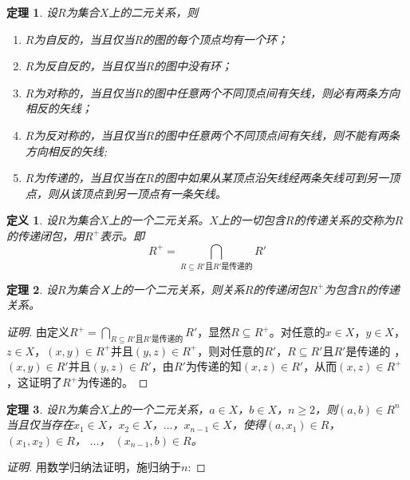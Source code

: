 \documentclass{article}
\newtheorem{Def}{定义}
\newtheorem{Thm}{定理}
\begin{document}
\begin{CJK*}{UTF8}{gbsn}
{
}  

  \begin{Thm}
  设$R$为集合$X$上的二元关系，则
  \begin{enumerate}
  \item $R$为自反的，当且仅当$R$的图的每个顶点均有一个环；
  \item $R$为反自反的，当且仅当$R$的图中没有环；
  \item $R$为对称的，当且仅当$R$的图中任意两个不同顶点间有矢线，则必有两条方向相反的矢线；
  \item $R$为反对称的，当且仅当$R$的图中任意两个不同顶点间有矢线，则不能有两条方向相反的矢线;
  \item $R$为传递的，当且仅当在$R$的图中如果从某顶点沿矢线经两条矢线可到另一顶点，则从该顶点到另一顶点有一条矢线。
  \end{enumerate}
\end{Thm}

  \begin{Def}
    设$R$为集合$X$上的一个二元关系。$X$上的一切包含$R$的传递关系的交称为$R$的传递闭包，用$R^+$表示。即
    \begin{equation*}
      R^+ = \bigcap_{R \subseteq R' \text{且} R'\text{是传递的}}R'
    \end{equation*}
  \end{Def}
  \begin{Thm}
    设$R$为集合Ｘ上的一个二元关系，则关系$R$的传递闭包$R^+$为包含$R$的传递关系。
  \end{Thm}
\begin{proof}[证明]
    由定义$R^+ = \bigcap_{R \subseteq R' \text{且} R'\text{是传递的}}R'$，显然$R\subseteq R^+$。对任意的$x\in X$，$y\in X$，$z\in X$，$(x,y)\in R^+$并且$(y,z)\in R^+$，则对任意的$R'$，$R\subseteq R'$且$R'$是传递的
，$(x,y)\in R'$并且$(y,z)\in R'$，由$R'$为传递的知$(x,z)\in R'$，从而$(x,z)\in R^+$，这证明了$R^+$为传递的。
  \end{proof}



    \begin{Thm}
    设$R$为集合$X$上的一个二元关系，$a \in X$，$b \in X$，$n \geq 2$，则$(a,b) \in R^n$当且仅当存在$x_1\in X$，$x_2\in X$，$\ldots$，$x_{n-1}\in X$，使得$(a, x_1) \in R$，$(x_1, x_2)\in R$，  $\ldots$， $(x_{n-1}, b)\in R$。
  \end{Thm}
  \begin{proof}[证明]
  用数学归纳法证明，施归纳于$n$:


\end{proof}
\end{CJK*}
\end{document}
